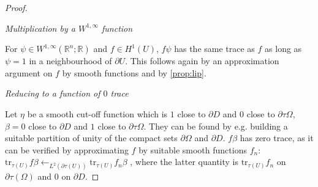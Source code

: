 \documentclass[english,a4paper,9pt,oneside]{scrbook}	%
\theoremstyle{break}
\newenvironment{mproof}[1][\proofname]{%
  \begin{proof}[#1]$ $\par\nobreak\ignorespaces
}{%
  \end{proof}
}
\renewcommand*{\proofname}{Proof}
\theoremstyle{remark}
\newcommand{\mR}{\mathbb{R}}
\newcommand{\ds}{\displaystyle}
\newcommand{\norm}[1]{\left\lVert#1\right\rVert}
\newcommand{\tr}{\text{tr}}
\begin{document}
\begin{appendices}
\begin{mproof}
%
%
%
%

\textit{Multiplication by a $W^{1,\infty}$ function}

For $\psi \in W^{1,\infty}(\mR^n;\mR)$ and $f \in H^1(U)$, $f\psi$ has the same trace as $f$ as long as $\psi = 1$ in a neighbourhood of $\partial U$. This follows again by an approximation argument on $f$ by smooth functions and by \cref{prop:lip}.

%

\textit{Reducing to a function of $0$ trace}

Let $\eta$ be a smooth cut-off function which is $1$ close to $\partial D$ and $0$ close to $\partial \tau\Omega$, $\beta=0$ close to $\partial D$ and $1$ close to $\partial \tau\Omega$. They can be found by e.g. building a suitable partition of unity of the compact sets $\partial \Omega$ and $\partial D$.
$f\beta$ has zero trace, as it can be verified by approximating $f$ by suitable smooth functions $f_n$: 
$\ds\tr_{\tau(U)} f\beta \leftarrow_{L^2(\partial \tau(U))} \tr_{\tau(U)} f_n \beta $
, where the latter quantity is $\tr_{\tau(U)} f_n $ on $\partial \tau(\Omega)$ and $0$ on $\partial D$.


\end{mproof}
\end{appendices}
\end{document}
